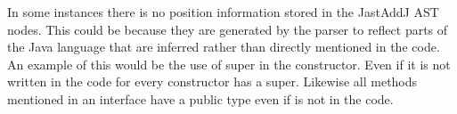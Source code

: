 % 

% 
% 



In some instances there is no position information stored in the JastAddJ AST nodes.  This could be because they are generated by the parser to reflect parts of the Java language that are inferred rather than directly mentioned in the code.  An example of this would be the use of super in the constructor.  Even if it is not written in the code for every constructor has a super. Likewise all methods mentioned in an interface have a public type even if is not in the code.

